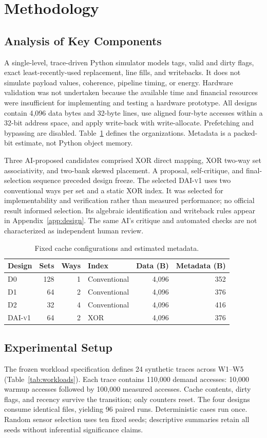 \documentclass[11pt,a4paper]{article}
\newcommand{\dai}{\textsc{DAI-v1}}
\begin{document}
\section{Methodology}
\subsection{Analysis of Key Components}
A single-level, trace-driven Python simulator models tags, valid and dirty flags, exact least-recently-used replacement, line fills, and writebacks. It does not simulate payload values, coherence, pipeline timing, or energy. Hardware validation was not undertaken because the available time and financial resources were insufficient for implementing and testing a hardware prototype. All designs contain 4,096 data bytes and 32-byte lines, use aligned four-byte accesses within a 32-bit address space, and apply write-back with write-allocate. Prefetching and bypassing are disabled. Table~\ref{tab:configs} defines the organizations. Metadata is a packed-bit estimate, not Python object memory.

Three AI-proposed candidates comprised XOR direct mapping, XOR two-way set associativity, and two-bank skewed placement. A proposal, self-critique, and final-selection sequence preceded design freeze. The selected \dai{} uses two conventional ways per set and a static XOR index. It was selected for implementability and verification rather than measured performance; no official result informed selection. Its algebraic identification and writeback rules appear in Appendix~\ref{app:design}. The same AI's critique and automated checks are not characterized as independent human review.

\begin{table}[htbp]\centering\small
\caption{Fixed cache configurations and estimated metadata.}\label{tab:configs}
\begin{tabular}{lrrlrr}\toprule
Design & Sets & Ways & Index & Data (B) & Metadata (B)\\\midrule
D0 & 128 & 1 & Conventional & 4,096 & 352\\
D1 & 64 & 2 & Conventional & 4,096 & 376\\
D2 & 32 & 4 & Conventional & 4,096 & 416\\
\dai{} & 64 & 2 & XOR & 4,096 & 376\\\bottomrule
\end{tabular}
\end{table}

\subsection{Experimental Setup}
The frozen workload specification defines 24 synthetic traces across W1--W5 (Table~\ref{tab:workloads}). Each trace contains 110,000 demand accesses: 10,000 warmup accesses followed by 100,000 measured accesses. Cache contents, dirty flags, and recency survive the transition; only counters reset. The four designs consume identical files, yielding 96 paired runs. Deterministic cases run once. Random sensor selection uses ten fixed seeds; descriptive summaries retain all seeds without inferential significance claims.
\end{document}
